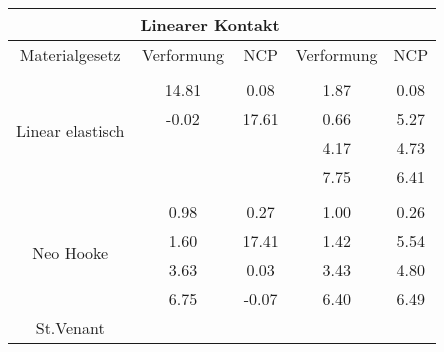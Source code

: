 \begin{table} 
\centering 
\begin{tabular}{c|cc|cc|} 
\cline{2-5} 
 & \multicolumn{2}{|c|}{Linearer Kontakt} &  \\ 
\hline 
\multicolumn{1}{|c|}{Materialgesetz} & \multicolumn{1}{c|}{Verformung} & \multicolumn{1}{c|}{NCP} & \multicolumn{1}{c|}{Verformung} & \multicolumn{1}{c|}{NCP} \\ 
\hline 
\multicolumn{1}{|c|}{\multirow{5}{*}{Linear elastisch}} &\multicolumn{1}{|c|}{} & \multicolumn{1}{|c|}{} & \multicolumn{1}{|c|}{} & \multicolumn{1}{|c|}{} \\ 
\multicolumn{1}{|c|}{} & \multicolumn{1}{|c|}{     14.81} & \multicolumn{1}{|c|}{      0.08} & \multicolumn{1}{|c|}{      1.87} & \multicolumn{1}{|c|}{      0.08} \\ 
\multicolumn{1}{|c|}{} & \multicolumn{1}{|c|}{     -0.02} & \multicolumn{1}{|c|}{     17.61} & \multicolumn{1}{|c|}{      0.66} & \multicolumn{1}{|c|}{      5.27} \\ 
\multicolumn{1}{|c|}{} & \multicolumn{1}{|c|}{} & \multicolumn{1}{|c|}{} & \multicolumn{1}{|c|}{      4.17} & \multicolumn{1}{|c|}{      4.73} \\ 
\multicolumn{1}{|c|}{} & \multicolumn{1}{|c|}{} & \multicolumn{1}{|c|}{} & \multicolumn{1}{|c|}{      7.75} & \multicolumn{1}{|c|}{      6.41} \\ 
\hline 
\multicolumn{1}{|c|}{\multirow{5}{*}{Neo Hooke}} &\multicolumn{1}{|c|}{} & \multicolumn{1}{|c|}{} & \multicolumn{1}{|c|}{} & \multicolumn{1}{|c|}{} \\ 
\multicolumn{1}{|c|}{} & \multicolumn{1}{|c|}{      0.98} & \multicolumn{1}{|c|}{      0.27} & \multicolumn{1}{|c|}{      1.00} & \multicolumn{1}{|c|}{      0.26} \\ 
\multicolumn{1}{|c|}{} & \multicolumn{1}{|c|}{      1.60} & \multicolumn{1}{|c|}{     17.41} & \multicolumn{1}{|c|}{      1.42} & \multicolumn{1}{|c|}{      5.54} \\ 
\multicolumn{1}{|c|}{} & \multicolumn{1}{|c|}{      3.63} & \multicolumn{1}{|c|}{      0.03} & \multicolumn{1}{|c|}{      3.43} & \multicolumn{1}{|c|}{      4.80} \\ 
\multicolumn{1}{|c|}{} & \multicolumn{1}{|c|}{      6.75} & \multicolumn{1}{|c|}{     -0.07} & \multicolumn{1}{|c|}{      6.40} & \multicolumn{1}{|c|}{      6.49} \\ 
\hline 
\multicolumn{1}{|c|}{\multirow{8}{*}{St.Venant}} &\multicolumn{1}{|c|}{} & \multicolumn{1}{|c|}{} & \multicolumn{1}{|c|}{} & \multicolumn{1}{|c|}{} \\ 

\end{tabular}
\end{table}
